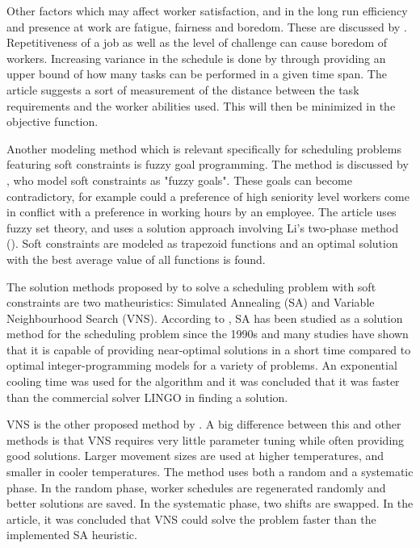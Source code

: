 Other factors which may affect worker satisfaction, and in the long run efficiency and presence at work are fatigue, fairness and boredom. These are discussed by  \citet{eiselt_2008}. Repetitiveness of a job as well as the level of challenge can cause boredom of workers. Increasing variance in the schedule is done by \citet{eiselt_2008} through providing an upper bound of how many tasks can be performed in a given time span. The article suggests a sort of measurement of the distance between the task requirements and the worker abilities used. This will then be minimized in the objective function.

Another modeling method which is relevant specifically for scheduling problems featuring soft constraints is fuzzy goal programming. The method is discussed by \citet{shahnazari_2013}, who model soft constraints as "fuzzy goals". These goals can become contradictory, for example could a preference of high seniority level workers come in conflict with a preference in working hours by an employee. The article uses fuzzy set theory, and uses a solution approach involving Li's two-phase method (\citet{li_1990}). Soft constraints are modeled as trapezoid functions and an optimal solution with the best average value of all functions is found.

The solution methods proposed by \citet{akbari_2013} to solve a scheduling problem with soft constraints are two matheuristics: Simulated Annealing (SA) and Variable Neighbourhood Search (VNS). According to \citet{akbari_2013}, SA has been studied as a solution method for the scheduling problem since the 1990s and many studies have shown that it is capable of providing near-optimal solutions in a short time compared to optimal integer-programming models for a variety of problems. An exponential cooling time was used for the algorithm and it was concluded that it was faster than the commercial solver LINGO in finding a solution.

VNS is the other proposed method by \citet{akbari_2013}. A big difference between this and other methods is that VNS requires very little parameter tuning while often providing good solutions.
Larger movement sizes are used at higher temperatures, and smaller in cooler temperatures. The method uses both a random and a systematic phase. In the random phase, worker schedules are regenerated randomly and better solutions are saved. In the systematic phase, two shifts are swapped. In the article, it was concluded that VNS could solve the problem faster than the implemented SA heuristic.

